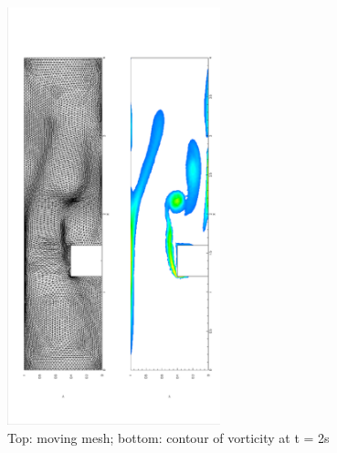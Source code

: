       \begin{figure}[!htbp]
        \centering
        \includegraphics[width = 0.55\textwidth, angle = -90]{picture/first/step_flow_data/mesh_t_2s.eps}
        \caption{\small Top: moving mesh; bottom: contour of vorticity
          at t = 2s}
        \label{fig::step_flow_2s}
      \end{figure}

